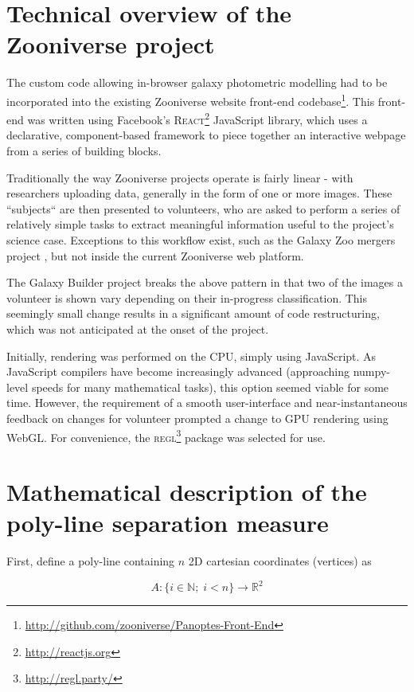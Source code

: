 \documentclass[../main.tex]{subfiles}
\begin{document}
\section{Technical overview of the Zooniverse project}

The custom code allowing in-browser galaxy photometric modelling had to be incorporated into the existing Zooniverse website front-end codebase\footnote{\url{http://github.com/zooniverse/Panoptes-Front-End}}. This front-end was written using Facebook's \textsc{React}\footnote{\url{http://reactjs.org}} JavaScript library, which uses a declarative, component-based framework to piece together an interactive webpage from a series of building blocks.

Traditionally the way Zooniverse projects operate is fairly linear - with researchers uploading data, generally in the form of one or more images. These ``subjects`` are then presented to volunteers, who are asked to perform a series of relatively simple tasks to extract meaningful information useful to the project's science case. Exceptions to this workflow exist, such as the Galaxy Zoo mergers project \citep{Holincheck2016:1604.00435v1}, but not inside the current Zooniverse web platform.

The Galaxy Builder project breaks the above pattern in that two of the images a volunteer is shown vary depending on their in-progress classification. This seemingly small change results in a significant amount of code restructuring, which was not anticipated at the onset of the project.

Initially, rendering was performed on the CPU, simply using JavaScript. As JavaScript compilers have become increasingly advanced (approaching numpy-level speeds for many mathematical tasks), this option seemed viable for some time. However, the requirement of a smooth user-interface and near-instantaneous feedback on changes for volunteer prompted a change to GPU rendering using WebGL. For convenience, the \textsc{regl}\footnote{\url{http://regl.party/}} package was selected for use.

\section{Mathematical description of the poly-line separation measure}
\label{appendix:clusteringMaths}

First, define a poly-line containing $n$ 2D cartesian coordinates (vertices) as

\begin{equation}
A: \{i \in \mathbb{N};\;i<n\} \longrightarrow \mathbb{R}
^2\end{equation}
\end{document}
